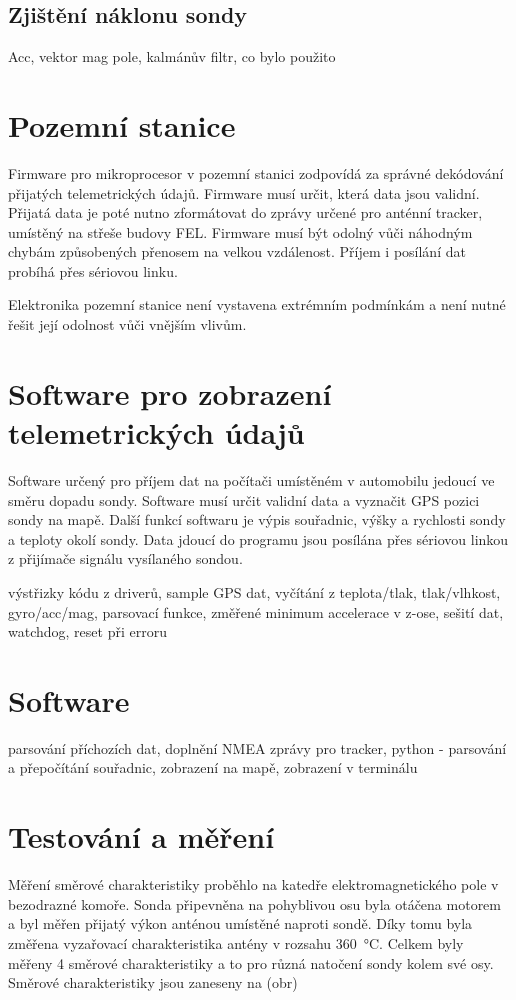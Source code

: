 \documentclass[twoside]{ctuthesis}
\theoremstyle{plain}
\theoremstyle{definition}
\theoremstyle{note}
\begin{document}
	\subsection{Zjištění náklonu sondy}
	Acc, vektor mag pole, kalmánův filtr, co bylo použito


\section{Pozemní stanice}
Firmware pro mikroprocesor v pozemní stanici zodpovídá za správné dekódování přijatých telemetrických údajů. Firmware musí určit, která data jsou validní. Přijatá data je poté nutno zformátovat do zprávy určené pro anténní tracker, umístěný na střeše budovy FEL. Firmware musí být odolný vůči náhodným chybám způsobených přenosem na velkou vzdálenost. Příjem i posílání dat probíhá přes sériovou linku. 

Elektronika pozemní stanice není vystavena extrémním podmínkám a není nutné řešit její odolnost vůči vnějším vlivům. 

\section{Software pro zobrazení telemetrických údajů}
Software určený pro příjem dat na počítači umístěném v automobilu jedoucí ve směru dopadu sondy. Software musí určit validní data a vyznačit GPS pozici sondy na mapě. Další funkcí softwaru je výpis souřadnic, výšky a rychlosti sondy a teploty okolí sondy. Data jdoucí do programu jsou posílána přes sériovou linkou z přijímače signálu vysílaného sondou. 

	výstřizky kódu z driverů, sample GPS dat, vyčítání z teplota/tlak, tlak/vlhkost, gyro/acc/mag, parsovací funkce, změřené minimum accelerace v z-ose, sešití dat, watchdog, reset při erroru

	\section{Software}
	parsování příchozích dat, doplnění NMEA zprávy pro tracker, python - parsování a přepočítání souřadnic, zobrazení na mapě, zobrazení v terminálu

	\section{Testování a měření}
	Měření směrové charakteristiky proběhlo na katedře elektromagnetického pole v bezodrazné komoře. Sonda připevněna na pohyblivou osu byla otáčena motorem a byl měřen přijatý výkon anténou umístěné naproti sondě. Díky tomu byla změřena vyzařovací charakteristika antény v rozsahu 360~°C. Celkem byly měřeny 4 směrové charakteristiky a to pro různá natočení sondy kolem své osy. Směrové charakteristiky jsou zaneseny na (obr)
\end{document}
